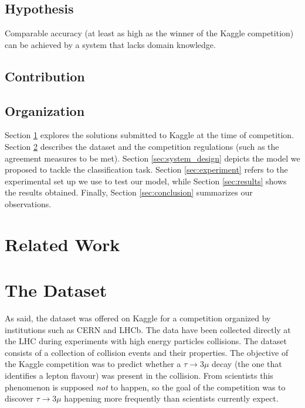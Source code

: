 \documentclass[conference]{IEEEtran}
\begin{document}
\subsection{Hypothesis}
\label{sec:hypothesis}
Comparable accuracy (at least as high as the winner of the Kaggle competition) can be achieved by a system that lacks domain knowledge.

\subsection{Contribution}


\subsection{Organization}
Section \ref{sec:related_work} explores the solutions submitted to Kaggle at the time of competition. Section \ref{sec:dataset} describes the dataset and the competition regulations (such as the agreement measures to be met). Section \ref{sec:system_design} depicts the model we proposed to tackle the classification task. Section \ref{sec:experiment} refers to the experimental set up we use to test our model, while Section \ref{sec:results} shows the results obtained. Finally, Section \ref{sec:conclusion} summarizes our observations.


\section{Related Work}
\label{sec:related_work}



\section{The Dataset}
\label{sec:dataset}
As said, the dataset was offered on Kaggle for a competition organized by
institutions such as CERN and LHCb. The data have been collected directly at the
LHC during experiments with high energy particles collisions. The dataset
consists of a collection of collision events and their properties. The objective
of the Kaggle competition was to predict whether a $\tau \rightarrow 3\mu$ decay
(the one that identifies a lepton flavour) was present in the collision. From
scientists this phenomenon is supposed \emph{not} to happen, so the goal of the
competition was to discover $\tau \rightarrow 3\mu$ happening more frequently
than scientists currently expect.
\end{document}
